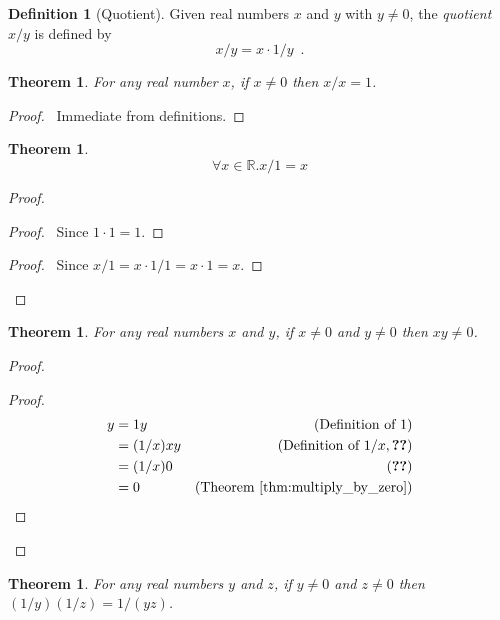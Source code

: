 \documentclass{report}
\let\qed\relax
\newtheorem{thm}[ax]{Theorem}
\theoremstyle{definition}
\newtheorem{df}[ax]{Definition}
\begin{document}
\begin{df}[Quotient]
Given real numbers $x$ and $y$ with $y \neq 0$, the \emph{quotient} $x/y$ is defined by
\[ x/y = x \cdot 1/y \enspace . \]
\end{df}

\begin{thm}
For any real number $x$, if $x \neq 0$ then $x/x = 1$.
\end{thm}

\begin{proof}
\pf\ Immediate from definitions. \qed
\end{proof}

\begin{thm}
\[ \forall x \in \mathbb{R}. x/1 = x \]
\end{thm}

\begin{proof}
\pf
{}
\begin{proof}
	\pf\ Since $1 \cdot 1 = 1$.
\end{proof}
\begin{proof}
	\pf\ Since $x/1 = x \cdot 1/1 = x \cdot 1 = x$.
\end{proof}
\qed
\end{proof}

\begin{thm}
For any real numbers $x$ and $y$, if $x \neq 0$ and $y \neq 0$ then $xy \neq 0$.
\end{thm}

\begin{proof}
\pf
{}
\begin{proof}
	\pf
	\begin{align*}
		y & = 1y & (\text{Definition of } 1) \\
		& = (1/x)xy & (\text{Definition of } 1/x, \text{\stepref{2}}) \\
		& = (1/x)0 & (\text{\stepref{2}}) \\
		& = 0 & (\text{Theorem \ref{thm:multiply_by_zero}})
	\end{align*}
\end{proof}
\qed
\end{proof}

\begin{thm}
For any real numbers $y$ and $z$, if $y \neq 0$ and $z \neq 0$ then $(1/y)(1/z) = 1/(yz)$.
\end{thm}
\end{document}
